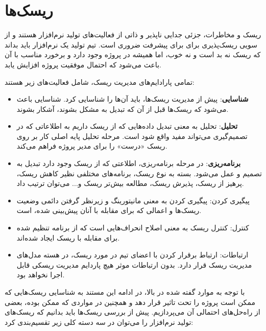 
\chapter{ریسک‌ها}

ریسک و مخاطرات، جزئی جدایی ناپذیر و ذاتی از فعالیت‌های تولید نرم‌افزار هستند و از سویی ریسک‌پذیری برای برای پیشرفت ضروری است. تیم تولید یک نرم‌افزار باید بداند که ریسک نه بد است و نه خوب، اما همیشه در پروژه وجود دارد و برخورد مناسب با آن باعث می‌شود که احتمال موفقیت پروژه افزایش یابد.


تمامی پارادایم‌های مدیریت ریسک، شامل فعالیت‌های زیر هستند:

\begin{itemize}
	\item
	 \textbf{شناسایی}: پیش از مدیریت ریسک‌ها، باید آن‌ها را شناسایی کرد. شناسایی باعث می‌شود که ریسک‌ها قبل از آن‌ که تبدیل به مشکل بشوند، آشکار بشوند. 
	 
	 \item
	 \textbf{تحلیل}: تحلیل به معنی تبدیل داده‌هایی که از ریسک داریم به اطلاعاتی که در تصمیم‌گیری می‌تواند مفید واقع شود است. مرحله تحلیل پایه اصلی کار بر روی ریسک «درست» را برای مدیر پروژه فراهم می‌کند.
	 
	 \item 
	 \textbf{برنامه‌ریزی}: در مرحله برنامه‌ریزی، اطلاعتی که از ریسک وجود دارد تبدیل به تصمیم و عمل می‌شود. بسته به نوع ریسک،  برنامه‌های مختلفی نظیر کاهش ریسک، پرهیز از ریسک، پذیرش ریسک، مطالعه بیش‌تر ریسک و... می‌توان ترتیب داد.
	 
	 \item
	 پیگیری کردن: پیگیری کردن به معنی مانیتورینگ و زیرنظر گرفتن دائمی وضعیت ریسک‌ها و اعمالی که برای مقابله با آنان پیش‌بینی شده،‌ است.
	 
	 \item 
	 کنترل: کنترل ریسک به معنی اصلاح انحراف‌هایی است که از برنامه تنظیم شده برای مقابله با ریسک ایجاد شده‌اند.
	 
	 \item
	 ارتباطات: ارتباط برقرار کردن با اعضای تیم در مورد ریسک، در هسته مدل‌های مدیریت ریسک قرار دارد. بدون ارتباطات موثر هیچ پاردایم مدیریت ریسکی قابل اجرا نخواهد بود.
	 
\end{itemize}


با توجه به موارد گفته شده در بالا، در ادامه این مستند به شناسایی ریسک‌هایی که ممکن است پروژه را تحت تاثیر قرار دهد و همچنین در مواردی که ممکن بوده، بعضی از راه‌حل‌های احتمالی آن می‌پردازیم. پیش از بررسی ریسک‌ها باید بدانیم که ریسک‌های تولید نرم‌افزار را می‌توان در سه دسته کلی زیر تقسیم‌بندی کرد:

